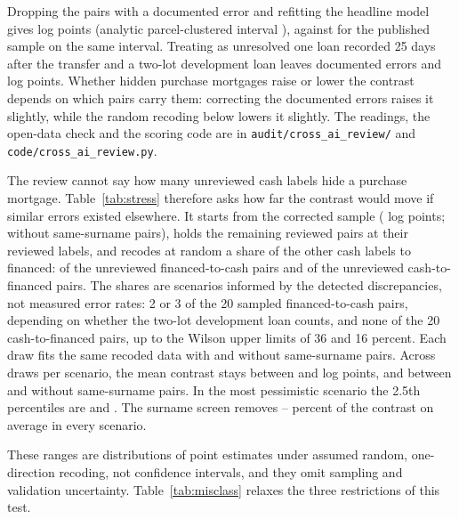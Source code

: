 \documentclass[12pt]{article}
\begin{document}
Dropping the \ReviewErrPairs{} pairs with a documented error and refitting the headline model gives \ReviewCorrected{} log points (analytic parcel-clustered interval \ReviewCorrectedCI{}), against \ReviewPublishedAnalytic{} \ReviewPublishedAnalyticCI{} for the published sample on the same interval. Treating as unresolved one loan recorded 25 days after the transfer and a two-lot development loan leaves \ReviewSensCashMtg{} documented errors and \ReviewSensCorrected{} log points. Whether hidden purchase mortgages raise or lower the contrast depends on which pairs carry them: correcting the documented errors raises it slightly, while the random recoding below lowers it slightly. The readings, the open-data check and the scoring code are in \texttt{audit/cross\_ai\_review/} and \texttt{code/cross\_ai\_review.py}.

The review cannot say how many unreviewed cash labels hide a purchase mortgage. Table~\ref{tab:stress} therefore asks how far the contrast would move if similar errors existed elsewhere. It starts from the corrected sample (\StressBase{} log points; \StressBaseNoRel{} without same-surname pairs), holds the \StressReviewedFixed{} remaining reviewed pairs at their reviewed labels, and recodes at random a share of the other cash labels to financed: of the \StressFCArm{} unreviewed financed-to-cash pairs and of the \StressCFArm{} unreviewed cash-to-financed pairs. The shares are scenarios informed by the detected discrepancies, not measured error rates: 2 or 3 of the 20 sampled financed-to-cash pairs, depending on whether the two-lot development loan counts, and none of the 20 cash-to-financed pairs, up to the Wilson upper limits of 36 and 16 percent. Each draw fits the same recoded data with and without same-surname pairs. Across \StressDraws{} draws per scenario, the mean contrast stays between \StressFullMeanLow{} and \StressFullMeanHigh{} log points, and between \StressNoRelMeanLow{} and \StressNoRelMeanHigh{} without same-surname pairs. In the most pessimistic scenario the 2.5th percentiles are \StressWorstFullLow{} and \StressWorstNoRelLow{}. The surname screen removes \StressShareLow{}--\StressShareHigh{} percent of the contrast on average in every scenario.

These ranges are distributions of point estimates under assumed random, one-direction recoding, not confidence intervals, and they omit sampling and validation uncertainty. Table~\ref{tab:misclass} relaxes the three restrictions of this test.
\end{document}
